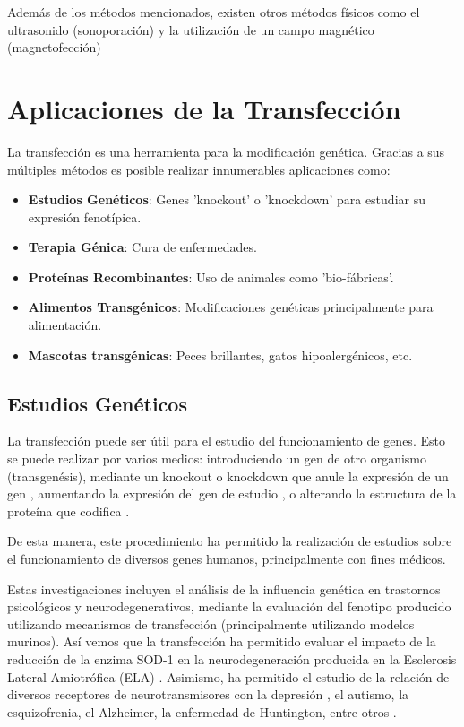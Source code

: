 \documentclass[fleqn,10pt]{SelfArx} %
\begin{document}
Además de los métodos mencionados, existen otros métodos físicos como el ultrasonido (sonoporación) y la utilización de un campo magnético (magnetofección) \cite{Kim:1996aa, Dobson:2006aa, Scherer:2002aa}



\section{Aplicaciones de la Transfección}

La transfección es una herramienta para la modificación genética. Gracias a sus múltiples métodos es posible realizar innumerables aplicaciones como:
\begin{itemize}[noitemsep] %
\item \textbf{Estudios Genéticos}: Genes 'knockout' o 'knockdown' para estudiar su expresión fenotípica.
\item \textbf{Terapia Génica}: Cura de enfermedades.
\item \textbf{Proteínas Recombinantes}: Uso de animales como 'bio-fábricas'.
\item \textbf{Alimentos Transgénicos}: Modificaciones genéticas principalmente para alimentación.
\item \textbf{Mascotas transgénicas}: Peces brillantes, gatos hipoalergénicos, etc.
\end{itemize}

\subsection{Estudios Genéticos}

La transfección puede ser útil para el estudio del funcionamiento de genes. Esto se puede realizar por varios medios: introduciendo un gen de otro organismo (transgenésis), mediante un knockout o knockdown que anule la expresión de un gen \cite{cryanin2004}, aumentando la expresión del gen de estudio \cite{yanni2004laboratory}, o alterando la estructura de la proteína que codifica \cite{ripps1995transgenic}.

De esta manera, este procedimiento ha permitido la realización de estudios sobre el funcionamiento de diversos genes humanos, principalmente con fines médicos.

Estas investigaciones incluyen el análisis de la influencia genética en trastornos psicológicos y neurodegenerativos, mediante la evaluación del fenotipo producido utilizando mecanismos de transfección (principalmente utilizando modelos murinos). Así vemos que la transfección ha permitido evaluar el impacto de la reducción de la enzima SOD-1 en la neurodegeneración producida en la Esclerosis Lateral Amiotrófica (ELA) \cite{ripps1995transgenic}. Asimismo, ha permitido el estudio de la relación de diversos receptores de neurotransmisores con la depresión \cite{cryanin2004}, el autismo, la esquizofrenia, el Alzheimer, la enfermedad de Huntington, entre otros \cite{anthe2002}.
\end{document}
